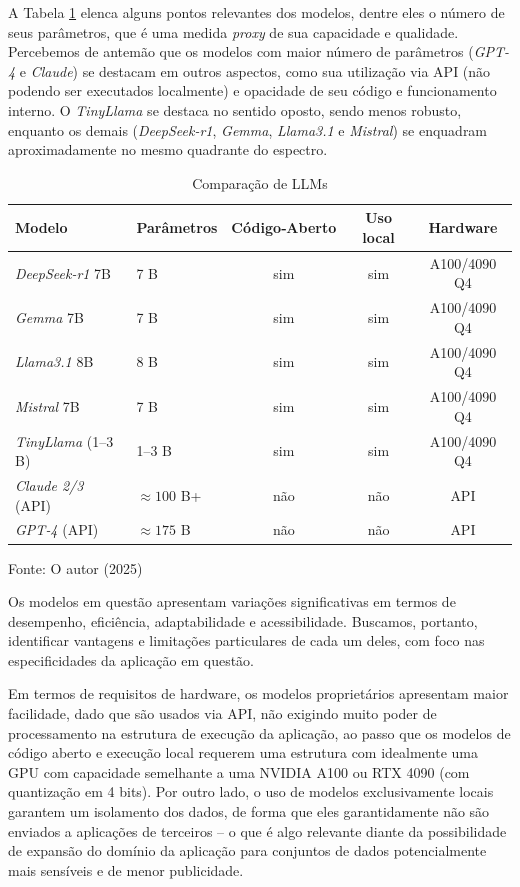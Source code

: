 A Tabela \ref{tab:comparacao-llms} elenca alguns pontos relevantes dos modelos, dentre eles o número de seus parâmetros, que é uma medida \textit{proxy} de sua capacidade e qualidade. Percebemos de antemão que os modelos com maior número de parâmetros (\textit{GPT-4} e \textit{Claude}) se destacam em outros aspectos, como sua utilização via API (não podendo ser executados localmente) e opacidade de seu código e funcionamento interno. O \textit{TinyLlama} se destaca no sentido oposto, sendo menos robusto, enquanto os demais (\textit{DeepSeek-r1}, \textit{Gemma}, \textit{Llama3.1} e \textit{Mistral}) se enquadram aproximadamente no mesmo quadrante do espectro.

\begin{table}[H]
    \caption{Comparação de \ac{LLM}s}
    \centering
    \begin{tabular}{llccc}
        \hline
        \bfseries Modelo & \bfseries Parâmetros & \bfseries Código‑Aberto & \bfseries Uso local & \bfseries Hardware\\  
        \hline
        \textit{DeepSeek‑r1} 7B & 7 B & sim & sim & A100/4090 Q4 \\
        \textit{Gemma} 7B & 7 B & sim & sim & A100/4090 Q4 \\
        \textit{Llama3.1} 8B & 8 B & sim & sim & A100/4090 Q4 \\
        \textit{Mistral} 7B & 7 B & sim & sim & A100/4090 Q4 \\
        \textit{TinyLlama} (1–3 B) & 1–3 B & sim & sim & A100/4090 Q4 \\
        \textit{Claude 2/3} (API) & $\approx 100$ B+ & não & não & API \\
        \textit{GPT‑4} (API) & $\approx 175$ B & não & não & API \\
        \hline
    \end{tabular}    
    Fonte: O autor (2025)
    \label{tab:comparacao-llms}
\end{table}

Os modelos em questão apresentam variações significativas em termos de desempenho, eficiência, adaptabilidade e acessibilidade. Buscamos, portanto, identificar vantagens e limitações particulares de cada um deles, com foco nas especificidades da aplicação em questão.

Em termos de requisitos de hardware, os modelos proprietários apresentam maior facilidade, dado que são usados via API, não exigindo muito poder de processamento na estrutura de execução da aplicação, ao passo que os modelos de código aberto e execução local requerem uma estrutura com idealmente uma GPU com capacidade semelhante a uma NVIDIA A100 ou RTX 4090 (com quantização em 4 bits). Por outro lado, o uso de modelos exclusivamente locais garantem um isolamento dos dados, de forma que eles garantidamente não são enviados a aplicações de terceiros -- o que é algo relevante diante da possibilidade de expansão do domínio da aplicação para conjuntos de dados potencialmente mais sensíveis e de menor publicidade.

